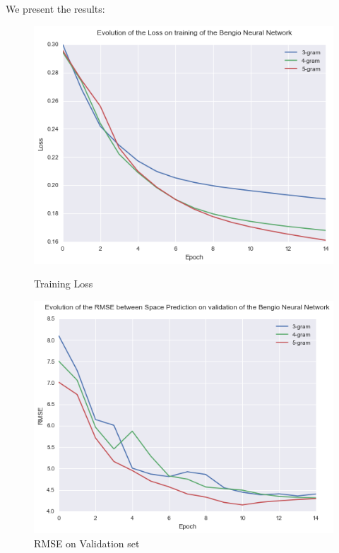 \documentclass[11pt]{article}
\begin{document}
We present the results:

\begin{figure}[H]
\centering
\begin{minipage}{.5\textwidth}
  \centering
  \includegraphics[width=1\linewidth]{train_nn}
  \caption{Training Loss}
\end{minipage}%
\begin{minipage}{.5\textwidth}
  \centering
  \includegraphics[width=1\linewidth]{rmse}
  \caption{RMSE on Validation set}
\end{minipage}
\end{figure}
\end{document}
